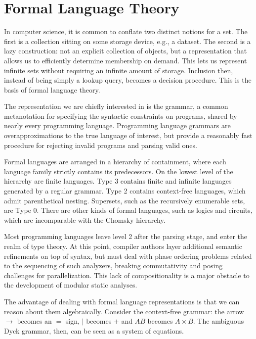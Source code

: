 \chapter{\rm\bfseries Formal Language Theory}
\label{ch:chapter01}

In computer science, it is common to conflate two distinct notions for a set. The first is a collection sitting on some storage device, e.g., a dataset. The second is a lazy construction: not an explicit collection of objects, but a representation that allows us to efficiently determine membership on demand. This lets us represent infinite sets without requiring an infinite amount of storage. Inclusion then, instead of being simply a lookup query, becomes a decision procedure. This is the basis of formal language theory.

The representation we are chiefly interested in is the grammar, a common metanotation for specifying the syntactic constraints on programs, shared by nearly every programming language. Programming language grammars are overapproximations to the true language of interest, but provide a reasonably fast procedure for rejecting invalid programs and parsing valid ones.

Formal languages are arranged in a hierarchy of containment, where each language family strictly contains its predecessors. On the lowest level of the hierarchy are finite languages. Type 3 contains finite and infinite languages generated by a regular grammar. Type 2 contains context-free languages, which admit parenthetical nesting. Supersets, such as the recursively enumerable sets, are  Type 0. There are other kinds of formal languages, such as logics and circuits, which are incomparable with the Chomsky hierarchy.

Most programming languages leave level 2 after the parsing stage, and enter the realm of type theory. At this point, compiler authors layer additional semantic refinements on top of syntax, but must deal with phase ordering problems related to the sequencing of such analyzers, breaking commutativity and posing challenges for parallelization. This lack of compositionality is a major obstacle to the development of modular static analyses.

The advantage of dealing with formal language representations is that we can reason about them algebraically. Consider the context-free grammar: the arrow $\rightarrow$ becomes an $=$ sign, $\mid$ becomes $+$ and $AB$ becomes $A \times B$. The ambiguous Dyck grammar, then, can be seen as a system of equations.

